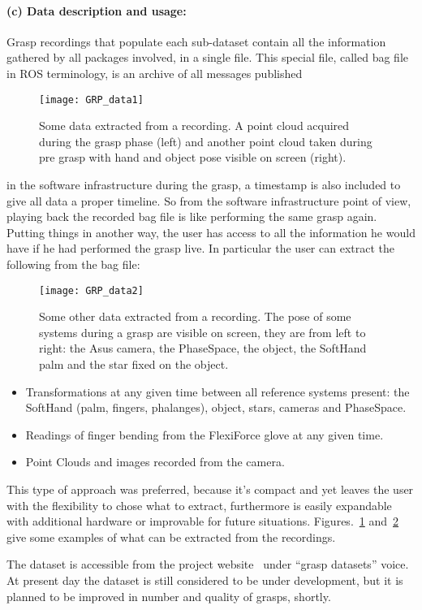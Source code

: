 \paragraph{(c) Data description and usage:}
Grasp recordings that populate each sub-dataset contain all the information gathered by all packages involved, in a single file. This special file, called bag file in ROS terminology, is an archive of all messages published
\begin{figure}[tb!]
  \centering
  \texttt{[image: GRP\_data1]}
  \caption{Some data extracted from a recording. A point cloud acquired during the grasp phase (left) and another point cloud taken during pre grasp with hand and object pose visible on screen (right).}
  \label{fig:grasp:data1}
\end{figure}
in the software infrastructure during the grasp, a timestamp is also included to give all data a proper timeline. So from the software infrastructure point of view, playing back the recorded bag file is like performing the
same grasp again. Putting things in another way, the user has access to all the information he would have if he had performed the grasp live. In particular the user can extract the following from the bag file:
\begin{figure}[tb!]
  \centering
  \texttt{[image: GRP\_data2]}
  \caption{Some other data extracted from a recording. The pose of some systems during a grasp are visible on screen, they are from left to right: the Asus camera, the PhaseSpace, the object, the SoftHand palm and the star fixed on the object.}
  \label{fig:grasp:data2}
\end{figure}
\begin{itemize}
  \item Transformations at any given time between all reference systems present: the SoftHand (palm, fingers, phalanges), object, stars, cameras and PhaseSpace.
  \item Readings of finger bending from the FlexiForce glove at any given time.
  \item Point Clouds and images recorded from the camera.
\end{itemize}

This type of approach was preferred, because it's compact and yet leaves the user with the flexibility to chose what to extract, furthermore is easily expandable with additional hardware or improvable for future situations.
Figures.~\ref{fig:grasp:data1} and~\ref{fig:grasp:data2} give some examples of what can be extracted from the recordings.

The dataset is accessible from the project website~\cite{website:pacman:dataset} under ``grasp datasets'' voice. At present day the dataset is still considered to be under development, but it is planned to be improved in number 
and quality of grasps, shortly.
